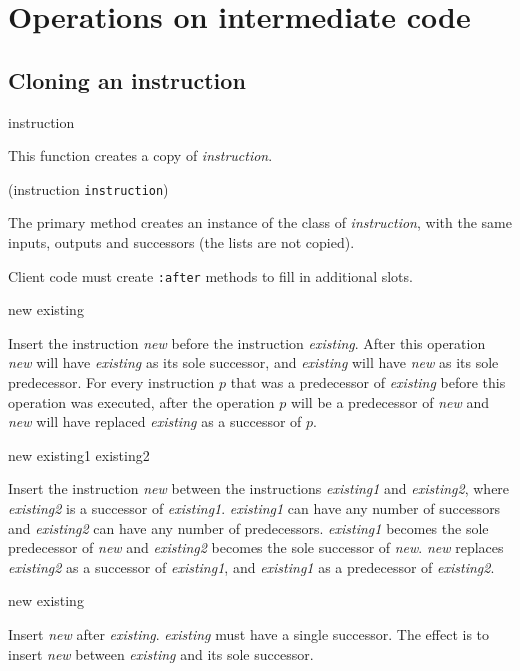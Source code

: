 \section{Operations on intermediate code}

\subsection{Cloning an instruction}

 {instruction}

This function creates a copy of \textit{instruction}.

 {(instruction {\tt instruction})}

The primary method creates an instance of the class of
\textit{instruction}, with the same inputs, outputs and successors
(the lists are not copied). 

Client code must create \texttt{:after} methods to fill in additional
slots. 

 {new existing}

Insert the instruction \textit{new} before the instruction
\textit{existing}.  After this operation \textit{new} will have
\textit{existing} as its sole successor, and \textit{existing} will
have \textit{new} as its sole predecessor.  For every instruction $p$
that was a predecessor of \textit{existing} before this operation was
executed, after the operation $p$ will be a predecessor of
\textit{new} and \textit{new} will have replaced \textit{existing} as
a successor of $p$.

 {new existing1 existing2}

Insert the instruction \textit{new} between the instructions
\textit{existing1} and \textit{existing2}, where \textit{existing2} is
a successor of \textit{existing1}.  \textit{existing1} can have any
number of successors and \textit{existing2} can have any number of
predecessors.  \textit{existing1} becomes the sole predecessor of
\textit{new} and \textit{existing2} becomes the sole successor of
\textit{new}.  \textit{new} replaces \textit{existing2} as a successor
of \textit{existing1}, and \textit{existing1} as a predecessor of
\textit{existing2}.

 {new existing}

Insert \textit{new} after \textit{existing}.  \textit{existing} must
have a single successor.  The effect is to insert \textit{new} between
\textit{existing} and its sole successor.

